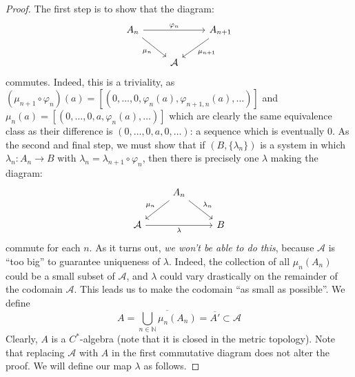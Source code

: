 \documentclass[aps,pra,showpacs,notitlepage,onecolumn,superscriptaddress,nofootinbib]{revtex4-1}
\theoremstyle{definition}
\begin{document}
\begin{proof}
  \noindent The first step is to show that the diagram:
  \[\begin{tikzcd}
	          {A_n} && {A_{n+1}} \\
	          & \mathcal{A}
	          \arrow["{\varphi_n}", from=1-1, to=1-3]
	          \arrow["{\mu_{n+1}}", from=1-3, to=2-2]
	          \arrow["{\mu_n}"', from=1-1, to=2-2]
  \end{tikzcd}\]
  commutes. Indeed, this is a triviality, as $(\mu_{n + 1} \circ \varphi_n)(a) = [(0, \dots, 0, \varphi_n(a), \varphi_{n + 1, n}(a), \dots)]$ and $\mu_n(a) = [(0, \dots, 0, a, \varphi_n(a), \dots)]$
  which are clearly the same equivalence class as their difference is $(0, \dots, 0, a, 0, \dots)$: a sequence which is eventually $0$. As the second and final step, we must show that if $(B, \{\lambda_n\})$
  is a system in which $\lambda_n : A_n \rightarrow B$ with $\lambda_n = \lambda_{n + 1} \circ \varphi_n$, then there is precisely one $\lambda$ making the diagram:
  \[\begin{tikzcd}
	& {A_n} \\
	\mathcal{A} && B
	\arrow["{\mu_n}"', from=1-2, to=2-1]
	\arrow["{\lambda_n}", from=1-2, to=2-3]
	\arrow["\lambda"', from=2-1, to=2-3]
  \end{tikzcd}\]
  commute for each $n$. As it turns out, \emph{we won't be able to do this}, because $\mathcal{A}$ is ``too big'' to guarantee uniqueness of $\lambda$. Indeed, the collection of all $\mu_n(A_n)$
  could be a small subset of $\mathcal{A}$, and $\lambda$ could vary drastically on the remainder of the codomain $\mathcal{A}$. This leads us to make the codomain ``as small as possible''. We define
  \begin{equation}
    A = \overline{\displaystyle\bigcup_{n \in \mathbb{N}} \mu_n(A_n)} = \overline{A'} \subset \mathcal{A}
  \end{equation}
  Clearly, $A$ is a $C^{*}$-algebra (note that it is closed in the metric topology). Note that replacing $\mathcal{A}$ with $A$ in the first commutative diagram does not alter the proof. We will define our map $\lambda$ as follows.
  \newline


\end{proof}
\end{document}
